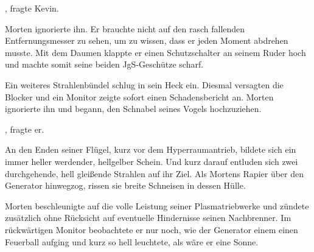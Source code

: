 \par

, fragte Kevin.

\par

Morten ignorierte ihn. Er brauchte nicht auf den rasch fallenden Entfernungsmesser zu sehen, um zu wissen, dass er jeden Moment abdrehen musste. Mit dem Daumen klappte er einen Schutzschalter an seinem Ruder hoch und machte somit seine beiden JgS-Geschütze scharf.

\par

Ein weiteres Strahlenbündel schlug in sein Heck ein. Diesmal versagten die Blocker und ein Monitor zeigte sofort einen Schadensbericht an. Morten ignorierte ihn und begann, den Schnabel seines Vogels hochzuziehen.

\par

, fragte er. 

\par

An den Enden seiner Flügel, kurz vor dem Hyperraumantrieb, bildete sich ein immer heller werdender, hellgelber Schein. Und kurz darauf entluden sich zwei durchgehende, hell gleißende Strahlen auf ihr Ziel. Als Mortens Rapier über den Generator hinwegzog, rissen sie breite Schneisen in dessen Hülle.

\par

Morten beschleunigte auf die volle Leistung seiner Plasmatriebwerke und zündete zusätzlich ohne Rücksicht auf eventuelle Hindernisse seinen Nachbrenner. Im rückwärtigen Monitor beobachtete er nur noch, wie der Generator einem einen Feuerball aufging und kurz so hell leuchtete, als wäre er eine Sonne.
